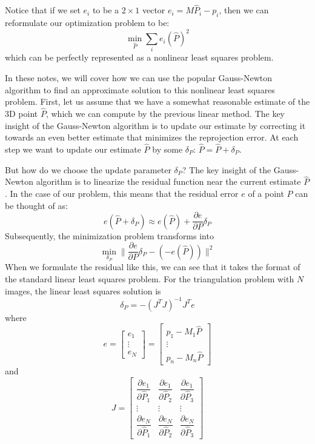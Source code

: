 \documentclass[a4paper, 12pt]{article}
\numberwithin{equation}{section}
\begin{document}
Notice that if we set $e_i$ to be a $2\times1$ vector $e_i = M\hat{P}_i - p_i$, then  we can reformulate our optimization problem to be:
\begin{equation}
    \min_{\hat{P}} \sum_i e_{i}(\hat{P})^2 
\end{equation}
which can be perfectly represented as a nonlinear least squares problem. 

In these notes, we will cover how we can use the popular Gauss-Newton algorithm to find an approximate solution to this nonlinear least squares problem. First, let us assume that we have a somewhat reasonable estimate of the 3D point $\hat{P}$, which we can compute by the previous linear method. The key insight of the Gauss-Newton algorithm is to update our estimate by correcting it towards an even better estimate that minimizes the reprojection error.  At each step we want to update our estimate $\hat{P}$ by some $\delta_P$: $\hat{P} = \hat{P} + \delta_P$.

But how do we choose the update parameter $\delta_P$? The key insight of the Gauss-Newton algorithm is to linearize the residual function near the current estimate $\hat{P}$. In the case of our problem, this means that the residual error $e$ of a point $P$ can be thought of as:
\begin{equation}
    e(\hat{P} + \delta_P) \approx e(\hat{P}) + \frac{\partial e}{\partial P}\delta_P
\end{equation}
Subsequently, the minimization problem transforms into
\begin{equation}
    \min_{\delta_P} \| \frac{\partial e}{\partial P}\delta_P - (-e(\hat{P})) \|^2
\end{equation}
When we formulate the residual like this, we can see that it takes the format of the standard linear least squares problem. For the triangulation problem with $N$ images, the linear least squares solution is
\begin{equation}
    \delta_P = -(J^TJ)^{-1} J^Te
\end{equation}
where 
\begin{equation}
    e = \begin{bmatrix} e_1 \\ \vdots \\ e_N\end{bmatrix} = \begin{bmatrix}p_1 - M_1\hat{P} \\ \vdots \\ p_n - M_n \hat{P} \end{bmatrix}
\end{equation}
and
\begin{equation}
    J = \begin{bmatrix}
    \dfrac{\partial e_1}{\partial \hat{P}_1} & \dfrac{\partial e_1}{\partial \hat{P}_2}& \dfrac{\partial e_1}{\partial \hat{P}_3}\\
    \vdots & \vdots & \vdots\\
    \dfrac{\partial e_N}{\partial \hat{P}_1} & \dfrac{\partial e_N}{\partial \hat{P}_2} & \dfrac{\partial e_N}{\partial \hat{P}_3} \end{bmatrix}
\end{equation}
 
\end{document}
